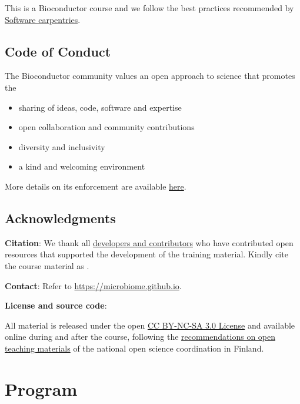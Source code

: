 \documentclass[
  oneside]{book}
\providecommand{\tightlist}{%
  \setlength{\itemsep}{0pt}\setlength{\parskip}{0pt}}
\begin{document}
This is a Bioconductor course \citet{Soneson2024} and we follow the best practices recommended by \href{https://carpentries.org}{Software carpentries}.

\hypertarget{code-of-conduct}{%
\section{Code of Conduct}\label{code-of-conduct}}

The Bioconductor community values an open approach to science that promotes the

\begin{itemize}
\tightlist
\item
  sharing of ideas, code, software and expertise
\item
  open collaboration and community contributions
\item
  diversity and inclusivity
\item
  a kind and welcoming environment
\end{itemize}

More details on its enforcement are available \href{https://bioconductor.github.io/bioc_coc_multilingual/}{here}.

\hypertarget{acknowledgments}{%
\section{Acknowledgments}\label{acknowledgments}}

\textbf{Citation}: We thank all \href{https://microbiome.github.io}{developers and contributors} who have contributed open resources that supported the development of the training material. Kindly cite the course material as \citet{miacourse}.

\textbf{Contact}: Refer to \url{https://microbiome.github.io}.

\textbf{License and source code}:

All material is released under the open \href{LICENSE}{CC BY-NC-SA 3.0 License} and available online during and after the course, following the \href{https://avointiede.fi/fi/linjaukset-ja-aineistot/kotimaiset-linjaukset/oppimisen-ja-oppimateriaalien-avoimuuden-linjaus}{recommendations on open teaching materials} of the national open science coordination in Finland.

\hypertarget{program}{%
\chapter{Program}\label{program}}
\end{document}
